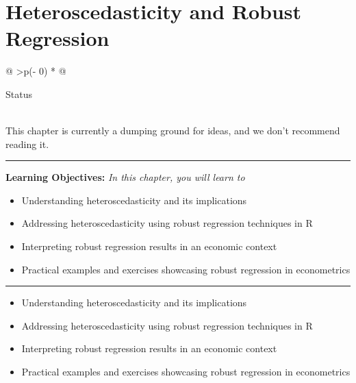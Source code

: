 \documentclass[
  letterpaper,
  paper =a4,
  twoside,
  openright,
  headsepline,
  footsepline,
  listof = totocnumbered,
  chapterprefix = true,
  firstiscover]{scrbook}
\providecommand{\abstractname}{Learning Objectives} %
\newenvironment{objectives}[1]{%
	\hrule
	\vspace{5pt}
	\small\textbf{\abstractname: } 
	\newline
	\vspace{0.1cm}
	\small\emph{#1} %
	\itshape %
}{%
	\vspace{5pt}
	\hrule
	\vspace{0.6cm}
}
\begin{document}
\hypertarget{heteroscedasticity-and-robust-regression}{%
\chapter{Heteroscedasticity and Robust
Regression}\label{heteroscedasticity-and-robust-regression}}

\begin{longtable}[]{@{}
  >{\centering\arraybackslash}p{(\columnwidth - 0\tabcolsep) * }@{}}
\toprule\noalign{}
\begin{minipage}[b]{\linewidth}\centering
Status
\end{minipage} \\
\midrule\noalign{}
\endhead
\bottomrule\noalign{}
\endlastfoot
This chapter is currently a dumping ground for ideas, and we don't
recommend reading it. \\
\end{longtable}

\begin{objectives}{In this chapter, you will learn to}
\begin{itemize}

\item{Understanding heteroscedasticity and its implications}

\item{Addressing heteroscedasticity using robust regression techniques in R}

\item{Interpreting robust regression results in an economic context}

\item{Practical examples and exercises showcasing robust regression in econometrics}

\end{itemize}

\end{objectives}

\begin{itemize}
\item
  Understanding heteroscedasticity and its implications
\item
  Addressing heteroscedasticity using robust regression techniques in R
\item
  Interpreting robust regression results in an economic context
\item
  Practical examples and exercises showcasing robust regression in
  econometrics
\end{itemize}
\end{document}
